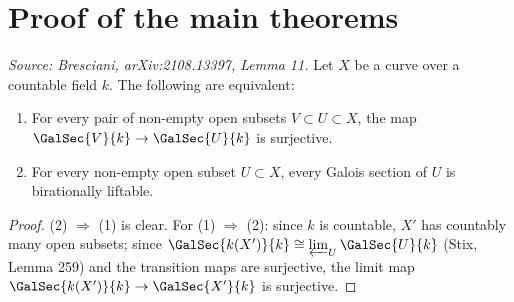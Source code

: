 \section{Proof of the main theorems}


\begin{lemma}[CuspBL]
  \label{lem:cusp-bl}
  \textit{Source: Bresciani, arXiv:2108.13397, Lemma 11.}
  Let \(X\) be a curve over a countable field \(k\). The following are equivalent:
  \begin{enumerate}
    \item For every pair of non-empty open subsets \(V \subset U \subset X\), the map
      \(\GalSec{V}{k} \to \GalSec{U}{k}\) is surjective.
    \item For every non-empty open subset \(U \subset X\), every Galois section of
      \(U\) is birationally liftable.
  \end{enumerate}
\end{lemma}

\begin{proof}
  (2) \(\Rightarrow\) (1) is clear. For (1) \(\Rightarrow\) (2): since \(k\) is
  countable, \(X'\) has countably many open subsets; since
  \(\GalSec{k(X')}{k} \cong \varprojlim_U \GalSec{U}{k}\) (Stix, Lemma 259) and the
  transition maps are surjective, the limit map \(\GalSec{k(X')}{k} \to \GalSec{X'}{k}\)
  is surjective.
\end{proof}

